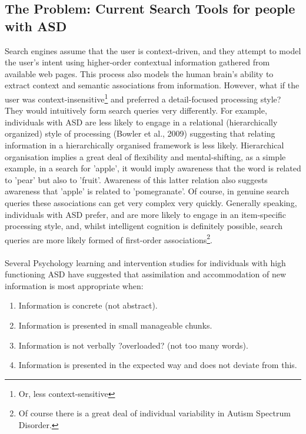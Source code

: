 \documentclass[11pt]{article}
\begin{document}
\subsection{The Problem: Current Search Tools for people with ASD} \label{problem}
Search engines assume that the user is context-driven, and they attempt to model the user's intent using higher-order contextual information gathered from available web pages. This process also models the human brain's ability to extract context and semantic associations from information. However, what if the user was context-insensitive\footnote{Or, less context-sensitive}  and preferred a detail-focused processing style? They would intuitively form search queries very differently. For example, individuals with ASD are less likely to engage in a relational (hierarchically organized) style of processing (Bowler et al., 2009) suggesting that relating information in a hierarchically organised framework is less likely. Hierarchical organisation implies a great deal of flexibility and mental-shifting, as a simple example, in a search for 'apple', it would imply awareness that the word is related to 'pear' but also to 'fruit'. Awareness of this latter relation also suggests awareness that 'apple' is related to 'pomegranate'. Of course, in genuine search queries these associations can get very complex very quickly. Generally speaking, individuals with ASD prefer, and are more likely to engage in an item-specific processing style, and, whilst intelligent cognition is definitely possible, search queries are more likely formed of first-order associations\footnote{Of course there is a great deal of individual variability in Autism Spectrum Disorder.}. \\
\\Several Psychology learning and intervention studies for individuals with high functioning ASD have suggested that assimilation and accommodation of new information is most appropriate when:\\
\begin{enumerate}
\item Information is concrete (not abstract).\\
\item Information is presented in small manageable chunks.\\
\item Information is not verbally ?overloaded? (not too many words).\\
\item Information is presented in the expected way and does not deviate from this.\\
\end{enumerate}
\end{document}
